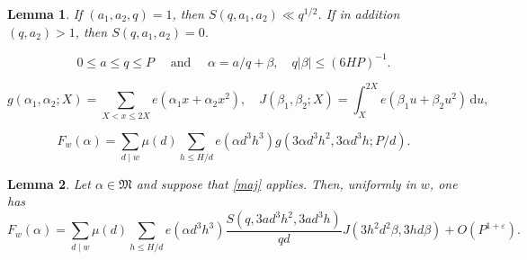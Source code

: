 \documentclass[10pt,a4paper]{amsart}
\newtheorem{lemma}{Lemma}
\newcommand\dd{{\mathrm d}}
\begin{document}
\begin{lemma}\label{L23} If $(a_1,a_2,q)=1$, then $S(q,a_1,a_2)\ll q^{1/2}$. If in addition $(q,a_2)>1$, then $S(q,a_1,a_2)=0$. \end{lemma}

\begin{equation}\label{maj} 0\le a\le q\le P \quad \text{ and } \quad\alpha = a/q +\beta, \quad q|\beta|\le (6HP)^{-1}. \end{equation}

\begin{equation}\label{37} g(\alpha_1,\alpha_2;X) = \sum_{X<x\le 2X} e(\alpha_1 x+\alpha_2 x^2), \quad J(\beta_1,\beta_2;X) = \int_X^{2X} e(\beta_1 u+\beta_2 u^2)\,\dd u, \end{equation}

\begin{equation}\label{38} F_w(\alpha) = \sum_{d\mid w} \mu(d) \sum_{h\le H/d} e(\alpha d^3h^3)
g(3\alpha d^3h^2, 3\alpha d^3h; P/d). \end{equation}

\begin{lemma}\label{L34} Let $\alpha\in\mathfrak M$  and suppose that \eqref{maj} applies. Then, uniformly in $w$, one has
$$ F_w(\alpha) = \sum_{d\mid w}\mu(d) \sum_{h\le H/d} e(\alpha d^3 h^3)
\frac{S(q,3ad^3h^2,3ad^3h)}{qd} J(3h^2d^2\beta, 3hd\beta) + O(P^{1+\varepsilon}).$$ 
\end{lemma}
\end{document}
